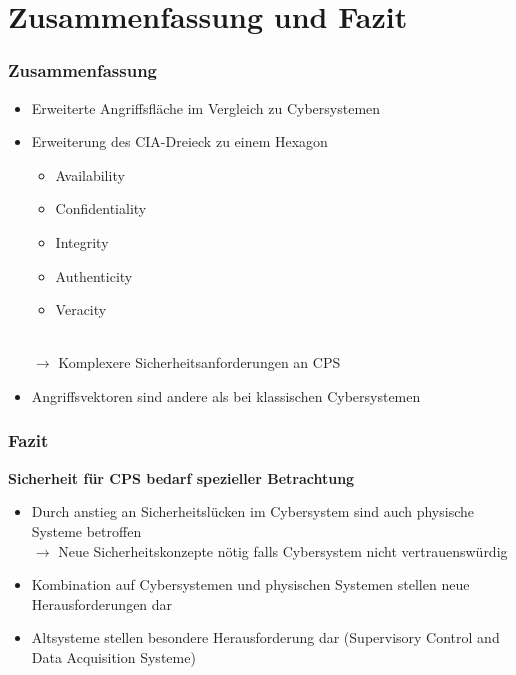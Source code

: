 \documentclass{sikslides}
\begin{document}
    \section{Zusammenfassung und Fazit}
    \begin{frame}
        \frametitle{Zusammenfassung}
        \begin{itemize}
            \item<1-> Erweiterte Angriffsfläche im Vergleich zu Cybersystemen
            \item<2-> Erweiterung des CIA-Dreieck zu einem Hexagon
            \begin{itemize}
                \item Availability
                \item Confidentiality
                \item Integrity
                \item Authenticity
                \item Veracity
            \end{itemize}
            \\$\rightarrow$ Komplexere Sicherheitsanforderungen an CPS
            \item<3-> Angriffsvektoren sind andere als bei klassischen Cybersystemen
        \end{itemize}
    \end{frame}

    \begin{frame}
        \frametitle{Fazit}

        \begin{center}
            \bf Sicherheit für CPS bedarf spezieller Betrachtung
        \end{center}

        \begin{itemize}[<+->]
            \item Durch anstieg an Sicherheitslücken im Cybersystem sind auch physische Systeme betroffen\\$\rightarrow$ Neue Sicherheitskonzepte nötig falls Cybersystem nicht vertrauenswürdig
            \item Kombination auf Cybersystemen und physischen Systemen stellen neue Herausforderungen dar
            \item Altsysteme stellen besondere Herausforderung dar (Supervisory Control and Data Acquisition Systeme)
        \end{itemize}
    \end{frame}
\end{document}
